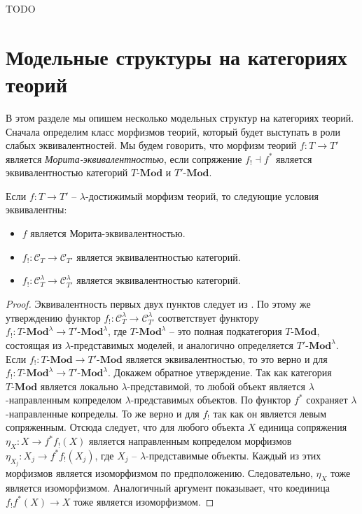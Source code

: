 \documentclass[reqno]{amsart}
\theoremstyle{definition}
\theoremstyle{remark}
\newcommand{\bcat}[1]{\mathbf{#1}}
\newcommand{\cat}[1]{\mathcal{#1}}
\newcommand{\Mod}[1]{#1\text{-}\bcat{Mod}}
\begin{document}
TODO

\section{Модельные структуры на категориях теорий}

В этом разделе мы опишем несколько модельных структур на категориях теорий.
Сначала определим класс морфизмов теорий, который будет выступать в роли слабых эквивалентностей.
Мы будем говорить, что морфизм теорий $f : T \to T'$ является \emph{Морита-эквивалентностью}, если сопряжение $f_! \dashv f^*$ является эквивалентностью категорий $\Mod{T}$ и $\Mod{T'}$.

\begin{prop}
Если $f : T \to T'$ -- $\lambda$-достижимый морфизм теорий, то следующие условия эквивалентны:
\begin{itemize}
\item $f$ является Морита-эквивалентностью.
\item $f_! : \cat{C}_T \to \cat{C}_{T'}$ является эквивалентностью категорий.
\item $f_! : \cat{C}_T^\lambda \to \cat{C}_{T'}^\lambda$ является эквивалентностью категорий.
\end{itemize}
\end{prop}
\begin{proof}
Эквивалентность первых двух пунктов следует из .
По этому же утверждению функтор $f_! : \cat{C}_T^\lambda \to \cat{C}_{T'}^\lambda$ соответствует функтору $f_! : \Mod{T}^\lambda \to \Mod{T'}^\lambda$,
где $\Mod{T}^\lambda$ -- это полная подкатегория $\Mod{T}$, состоящая из $\lambda$-представимых моделей, и аналогично определяется $\Mod{T'}^\lambda$.
Если $f_! : \Mod{T} \to \Mod{T'}$ является эквивалентностью, то это верно и для $f_! : \Mod{T}^\lambda \to \Mod{T'}^\lambda$.
Докажем обратное утверждение.
Так как категория $\Mod{T}$ является локально $\lambda$-представимой, то любой объект является $\lambda$-направленным копределом $\lambda$-представимых объектов.
По  функтор $f^*$ сохраняет $\lambda$-направленные копределы.
То же верно и для $f_!$ так как он является левым сопряженным.
Отсюда следует, что для любого объекта $X$ единица сопряжения $\eta_X : X \to f^* f_!(X)$
является направленным копределом морфизмов $\eta_{X_j} : X_j \to f^* f_! (X_j)$, где $X_j$ -- $\lambda$-представимые объекты.
Каждый из этих морфизмов является изоморфизмом по предположению.
Следовательно, $\eta_X$ тоже является изоморфизмом.
Аналогичный аргумент показывает, что коединица $f_! f^*(X) \to X$ тоже является изоморфизмом.
\end{proof}
\end{document}
